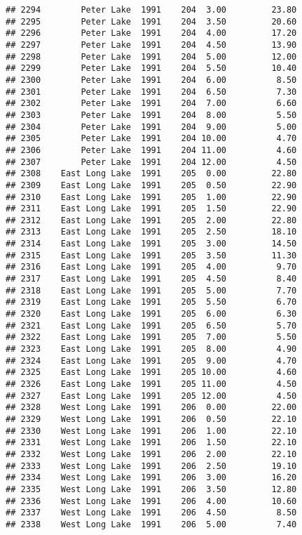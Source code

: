 \documentclass[
]{article}
\begin{document}
\begin{verbatim}
## 2294        Peter Lake  1991    204  3.00         23.80
## 2295        Peter Lake  1991    204  3.50         20.60
## 2296        Peter Lake  1991    204  4.00         17.20
## 2297        Peter Lake  1991    204  4.50         13.90
## 2298        Peter Lake  1991    204  5.00         12.00
## 2299        Peter Lake  1991    204  5.50         10.40
## 2300        Peter Lake  1991    204  6.00          8.50
## 2301        Peter Lake  1991    204  6.50          7.30
## 2302        Peter Lake  1991    204  7.00          6.60
## 2303        Peter Lake  1991    204  8.00          5.50
## 2304        Peter Lake  1991    204  9.00          5.00
## 2305        Peter Lake  1991    204 10.00          4.70
## 2306        Peter Lake  1991    204 11.00          4.60
## 2307        Peter Lake  1991    204 12.00          4.50
## 2308    East Long Lake  1991    205  0.00         22.80
## 2309    East Long Lake  1991    205  0.50         22.90
## 2310    East Long Lake  1991    205  1.00         22.90
## 2311    East Long Lake  1991    205  1.50         22.90
## 2312    East Long Lake  1991    205  2.00         22.80
## 2313    East Long Lake  1991    205  2.50         18.10
## 2314    East Long Lake  1991    205  3.00         14.50
## 2315    East Long Lake  1991    205  3.50         11.30
## 2316    East Long Lake  1991    205  4.00          9.70
## 2317    East Long Lake  1991    205  4.50          8.40
## 2318    East Long Lake  1991    205  5.00          7.70
## 2319    East Long Lake  1991    205  5.50          6.70
## 2320    East Long Lake  1991    205  6.00          6.30
## 2321    East Long Lake  1991    205  6.50          5.70
## 2322    East Long Lake  1991    205  7.00          5.50
## 2323    East Long Lake  1991    205  8.00          4.90
## 2324    East Long Lake  1991    205  9.00          4.70
## 2325    East Long Lake  1991    205 10.00          4.60
## 2326    East Long Lake  1991    205 11.00          4.50
## 2327    East Long Lake  1991    205 12.00          4.50
## 2328    West Long Lake  1991    206  0.00         22.00
## 2329    West Long Lake  1991    206  0.50         22.10
## 2330    West Long Lake  1991    206  1.00         22.10
## 2331    West Long Lake  1991    206  1.50         22.10
## 2332    West Long Lake  1991    206  2.00         22.10
## 2333    West Long Lake  1991    206  2.50         19.10
## 2334    West Long Lake  1991    206  3.00         16.20
## 2335    West Long Lake  1991    206  3.50         12.80
## 2336    West Long Lake  1991    206  4.00         10.60
## 2337    West Long Lake  1991    206  4.50          8.50
## 2338    West Long Lake  1991    206  5.00          7.40

\end{verbatim}
\end{document}
